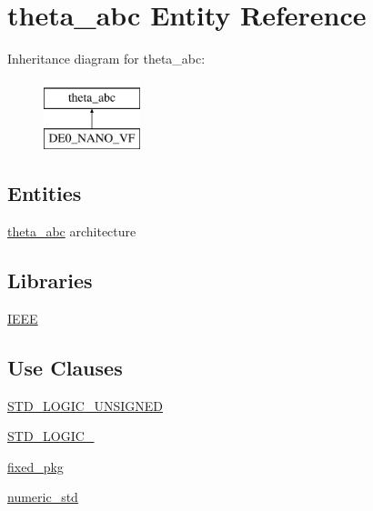 \hypertarget{classtheta__abc}{}\section{theta\+\_\+abc Entity Reference}
\label{classtheta__abc}
Inheritance diagram for theta\+\_\+abc\+:\begin{figure}[H]
\begin{center}
\leavevmode
\includegraphics[height=2.000000cm]{classtheta__abc}
\end{center}
\end{figure}
\subsection*{Entities}
\begin{DoxyCompactItemize}
\item 
\hyperlink{classtheta__abc_1_1theta__abc}{theta\+\_\+abc} architecture
\end{DoxyCompactItemize}
\subsection*{Libraries}
 \begin{DoxyCompactItemize}
\item 
\hyperlink{classtheta__abc_ae4f03c286607f3181e16b9aa12d0c6d4}{I\+E\+E\+E} 
\end{DoxyCompactItemize}
\subsection*{Use Clauses}
 \begin{DoxyCompactItemize}
\item 
\hyperlink{classtheta__abc_a241c3e72dd8024cc8ae831b1b2aed7db}{S\+T\+D\+\_\+\+L\+O\+G\+I\+C\+\_\+\+U\+N\+S\+I\+G\+N\+E\+D}   
\item 
\hyperlink{classtheta__abc_aa4b2b25246a821511120e3149b003563}{S\+T\+D\+\_\+\+L\+O\+G\+I\+C\+\_}   
\item 
\hyperlink{classtheta__abc_aad86249c80e8c1e7ee1c4748aba748e3}{fixed\+\_\+pkg}   
\item 
\hyperlink{classtheta__abc_a2edc34402b573437d5f25fa90ba4013e}{numeric\+\_\+std}   
\end{DoxyCompactItemize}
